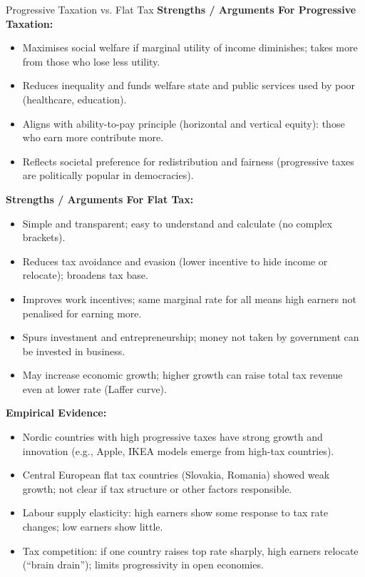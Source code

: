 \documentclass[11pt, a4paper, twoside]{book}
\begin{document}
\begin{evaluation}{Progressive Taxation vs. Flat Tax}
\textbf{Strengths / Arguments For Progressive Taxation:}
\begin{itemize}[leftmargin=*, nosep]
\item Maximises social welfare if marginal utility of income diminishes; takes more from those who lose less utility.
\item Reduces inequality and funds welfare state and public services used by poor (healthcare, education).
\item Aligns with ability-to-pay principle (horizontal and vertical equity): those who earn more contribute more.
\item Reflects societal preference for redistribution and fairness (progressive taxes are politically popular in democracies).
\end{itemize}
\textbf{Strengths / Arguments For Flat Tax:}
\begin{itemize}[leftmargin=*, nosep]
\item Simple and transparent; easy to understand and calculate (no complex brackets).
\item Reduces tax avoidance and evasion (lower incentive to hide income or relocate); broadens tax base.
\item Improves work incentives; same marginal rate for all means high earners not penalised for earning more.
\item Spurs investment and entrepreneurship; money not taken by government can be invested in business.
\item May increase economic growth; higher growth can raise total tax revenue even at lower rate (Laffer curve).
\end{itemize}
\textbf{Empirical Evidence:}
\begin{itemize}[leftmargin=*, nosep]
\item Nordic countries with high progressive taxes have strong growth and innovation (e.g., Apple, IKEA models emerge from high-tax countries).
\item Central European flat tax countries (Slovakia, Romania) showed weak growth; not clear if tax structure or other factors responsible.
\item Labour supply elasticity: high earners show some response to tax rate changes; low earners show little.
\item Tax competition: if one country raises top rate sharply, high earners relocate (``brain drain''); limits progressivity in open economies.

\end{itemize}
\end{evaluation}
\end{document}
